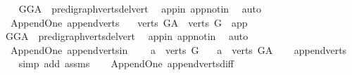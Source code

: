 \begin{isabellebody}
%
\isadelimproof
\ \ %
\endisadelimproof
%
\isatagproof
{}\isamarkupfalse%
\ GG{\isacharunderscore}{\kern0pt}A\ \ pre{\isacharunderscore}{\kern0pt}digraph{\isachardot}{\kern0pt}verts{\isacharunderscore}{\kern0pt}del{\isacharunderscore}{\kern0pt}vert\ \isamarkupfalse%
\ app{\isacharunderscore}{\kern0pt}in\ app{\isacharunderscore}{\kern0pt}notin\ \isamarkupfalse%
\ auto%
\endisatagproof
{\isafoldproof}%
%
\isadelimproof
\isanewline
%
\endisadelimproof
\isanewline
{}\isamarkupfalse%
\ {\isacharparenleft}{\kern0pt}\ Append{\isacharunderscore}{\kern0pt}One{\isacharparenright}{\kern0pt}\ append{\isacharunderscore}{\kern0pt}verts{\isacharcolon}{\kern0pt}\ \isanewline
\ \ {\isachardoublequoteopen}verts\ G{\isacharunderscore}{\kern0pt}A\ {\isacharequal}{\kern0pt}\ verts\ G\ {\isasymunion}\ {\isacharbraceleft}{\kern0pt}app{\isacharbraceright}{\kern0pt}{\isachardoublequoteclose}\isanewline
%
\isadelimproof
\ \ %
\endisadelimproof
%
\isatagproof
{}\isamarkupfalse%
\ GG{\isacharunderscore}{\kern0pt}A\ \ pre{\isacharunderscore}{\kern0pt}digraph{\isachardot}{\kern0pt}verts{\isacharunderscore}{\kern0pt}del{\isacharunderscore}{\kern0pt}vert\ \isamarkupfalse%
\ app{\isacharunderscore}{\kern0pt}in\ app{\isacharunderscore}{\kern0pt}notin\ \isamarkupfalse%
\ auto%
\endisatagproof
{\isafoldproof}%
%
\isadelimproof
\isanewline
%
\endisadelimproof
\isanewline
{}\isamarkupfalse%
\ {\isacharparenleft}{\kern0pt}\ Append{\isacharunderscore}{\kern0pt}One{\isacharparenright}{\kern0pt}\ append{\isacharunderscore}{\kern0pt}verts{\isacharunderscore}{\kern0pt}in{\isacharcolon}{\kern0pt}\ \isanewline
\ \ \ {\isachardoublequoteopen}a\ {\isasymin}\ verts\ G{\isachardoublequoteclose}\isanewline
\ \ \ {\isachardoublequoteopen}a\ {\isasymin}\ verts\ G{\isacharunderscore}{\kern0pt}A{\isachardoublequoteclose}\isanewline
%
\isadelimproof
\ \ %
\endisadelimproof
%
\isatagproof
{}\isamarkupfalse%
\ append{\isacharunderscore}{\kern0pt}verts\isanewline
\ \ \isamarkupfalse%
\ {\isacharparenleft}{\kern0pt}simp\ add{\isacharcolon}{\kern0pt}\ assms{\isacharparenright}{\kern0pt}%
\endisatagproof
{\isafoldproof}%
%
\isadelimproof
\ \isanewline
%
\endisadelimproof
\isanewline
{}\isamarkupfalse%
\ {\isacharparenleft}{\kern0pt}\ Append{\isacharunderscore}{\kern0pt}One{\isacharparenright}{\kern0pt}\ append{\isacharunderscore}{\kern0pt}verts{\isacharunderscore}{\kern0pt}diff{\isacharcolon}{\kern0pt}\ \isanewline

\end{isabellebody}
